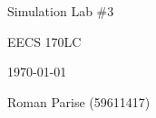 \centering
\vspace*{5cm}
{\huge Simulation Lab \#3 \par}
{\Large EECS 170LC \par}
{\Large \today \par}
\vspace{1cm}
{\large Roman Parise (59611417) \par}
\vspace{1cm}

